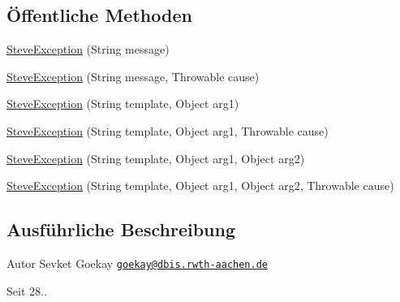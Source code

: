 \subsection*{Öffentliche Methoden}
\begin{DoxyCompactItemize}
\item 
\hyperlink{classde_1_1rwth_1_1idsg_1_1steve_1_1_steve_exception_a60678566b5bc3dc292dfdc0dab7f9b52}{Steve\+Exception} (String message)
\item 
\hyperlink{classde_1_1rwth_1_1idsg_1_1steve_1_1_steve_exception_a5b5e6f2373fe77dcdc3524e8345e2444}{Steve\+Exception} (String message, Throwable cause)
\item 
\hyperlink{classde_1_1rwth_1_1idsg_1_1steve_1_1_steve_exception_a12e0dc4e53a14e837c1d55d4cc74013b}{Steve\+Exception} (String template, Object arg1)
\item 
\hyperlink{classde_1_1rwth_1_1idsg_1_1steve_1_1_steve_exception_af538eab03d9be9e9ef03fb7d88350494}{Steve\+Exception} (String template, Object arg1, Throwable cause)
\item 
\hyperlink{classde_1_1rwth_1_1idsg_1_1steve_1_1_steve_exception_a747b28e34863586991cc9dc2907a22b1}{Steve\+Exception} (String template, Object arg1, Object arg2)
\item 
\hyperlink{classde_1_1rwth_1_1idsg_1_1steve_1_1_steve_exception_a808ddf40f0b83ea373337ccfe152de67}{Steve\+Exception} (String template, Object arg1, Object arg2, Throwable cause)
\end{DoxyCompactItemize}


\subsection{Ausführliche Beschreibung}
\begin{DoxyAuthor}{Autor}
Sevket Goekay \href{mailto:goekay@dbis.rwth-aachen.de}{\tt goekay@dbis.\+rwth-\/aachen.\+de} 
\end{DoxyAuthor}
\begin{DoxySince}{Seit}
28.. 
\end{DoxySince}


